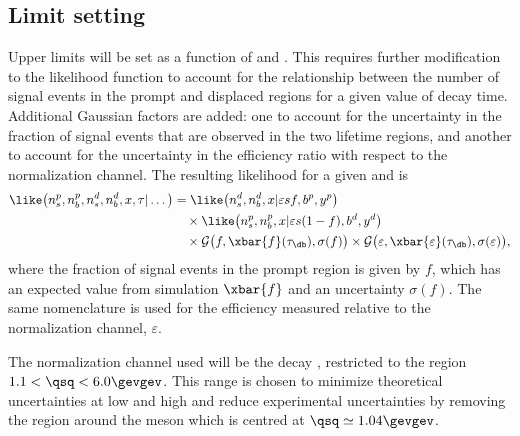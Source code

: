 \subsection{Limit setting}
Upper limits will be set as a function of \mass{\db} and \lifetime{\db}.
This requires further modification to the likelihood function to account for the relationship
between the number of signal events in the prompt and displaced regions for a given value of
decay time.
Additional Gaussian factors are added: one to account for the uncertainty in the fraction of
signal events that are observed in the two lifetime regions, and another to account for the
uncertainty in the efficiency ratio with respect to the normalization channel.
The resulting likelihood for a given \mass{\db} and \lifetime{\db} is
\begin{align}
  \like\big(n_s^p, n_b^p, n_s^d, n_b^d, x, \tau | \dots\big) &=
   \like\big(n_s^d, n_b^d, x | \varepsilon s f,b^p,y^p\big) \nonumber\\
   &\quad\times\like\big(n_s^p, n_b^p, x | \varepsilon s(1-f),b^d,y^d\big)\nonumber\\
   &\quad\times\mathcal{G}\big(f, \xbar{f}(\tau_\db),\sigma(f)\big)
   \times\mathcal{G}\big(\varepsilon, \xbar{\varepsilon}(\tau_\db),\sigma(\varepsilon)\big),
   \label{eq:db:lim}
\end{align}
where the fraction of signal events in the prompt region is given by $f$,
which has an expected value from simulation $\xbar{f}$ and an uncertainty $\sigma(f)$.
The same nomenclature is used for the efficiency measured relative to the normalization channel,
$\varepsilon$.

The normalization channel used will be the \sm decay \btokstrmumu, restricted to the region
$1.1<\qsq<6.0\gevgev$.
This range is chosen to minimize theoretical uncertainties at low and high \qsq and reduce
experimental uncertainties by removing the region around the \phii meson which is centred at
$\qsq\simeq1.04\gevgev$.



